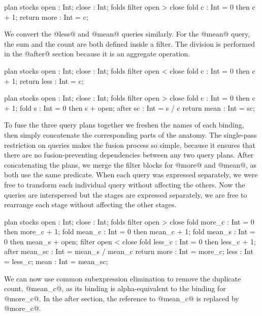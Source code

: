 \begin{icicle-core}
plan stocks { open : Int; close : Int; }
folds { filter open > close {
    fold c    : Int = 0 then c + 1; } }
return { more : Int = c; }
\end{icicle-core}

We convert the @less@ and @mean@ queries similarly.
For the @mean@ query, the sum and the count are both defined inside a filter.
The division is performed in the @after@ section because it is an aggregate operation.

\begin{icicle-core}
plan stocks { open : Int; close : Int; }
folds { filter open < close {
    fold c    : Int = 0 then c + 1; } }
return { less : Int = c; }

plan stocks { open : Int; close : Int; }
folds { filter open > close {
    fold c    : Int = 0 then c + 1;
    fold s    : Int = 0 then s + open; } }
after  { sc   : Int = s / c }
return { mean : Int = sc; }
\end{icicle-core}

To fuse the three query plans together we freshen the names of each binding, then simply concatenate the corresponding parts of the anatomy.
The single-pass restriction on queries makes the fusion process so simple, because it ensures that there are no fusion-preventing dependencies between any two query plans. 
After concatenating the plans, we merge the filter blocks for @more@ and @mean@, as both use the same predicate.
When each query was expressed separately, we were free to transform each individual query without affecting the others.
Now the queries are interspersed but the stages are expressed separately, we are free to rearrange each stage without affecting the other stages.

\begin{icicle-core}
plan stocks { open : Int; close : Int; }
folds {
  filter open > close {
    fold more_c  : Int = 0 then more_c + 1;
    fold mean_c  : Int = 0 then mean_c + 1;
    fold mean_s  : Int = 0 then mean_s + open; }
  filter open < close {
    fold less_c  : Int = 0 then less_c + 1; } }
after  { mean_sc : Int = mean_s / mean_c }
return { more    : Int = more_c;
         less    : Int = less_c;
         mean    : Int = mean_sc; }
\end{icicle-core}

We can now use common subexpression elimination to remove the duplicate count, @mean_c@, as its binding is alpha-equivalent to the binding for @more_c@.
In the after section, the reference to @mean_c@ is replaced by @more_c@.

